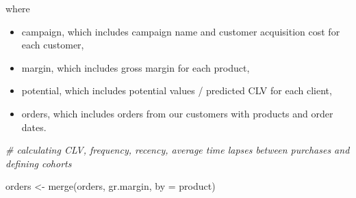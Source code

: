 \documentclass[
]{book}
\newenvironment{Shaded}{\begin{snugshade}}{\end{snugshade}}
\newcommand{\AttributeTok}[1]{\textcolor[rgb]{0.77,0.63,0.00}{#1}}
\newcommand{\CommentTok}[1]{\textcolor[rgb]{0.56,0.35,0.01}{\textit{#1}}}
\newcommand{\FunctionTok}[1]{\textcolor[rgb]{0.00,0.00,0.00}{#1}}
\newcommand{\NormalTok}[1]{#1}
\newcommand{\OtherTok}[1]{\textcolor[rgb]{0.56,0.35,0.01}{#1}}
\newcommand{\StringTok}[1]{\textcolor[rgb]{0.31,0.60,0.02}{#1}}
\providecommand{\tightlist}{%
  \setlength{\itemsep}{0pt}\setlength{\parskip}{0pt}}
\begin{document}
where

\begin{itemize}
\tightlist
\item
  campaign, which includes campaign name and customer acquisition cost for each customer,
\item
  margin, which includes gross margin for each product,
\item
  potential, which includes potential values / predicted CLV for each client,
\item
  orders, which includes orders from our customers with products and order dates.
\end{itemize}

\begin{Shaded}
\begin{Highlighting}[]
\CommentTok{\# calculating CLV, frequency, recency, average time lapses between purchases and defining cohorts}

\NormalTok{orders }\OtherTok{\textless{}{-}} \FunctionTok{merge}\NormalTok{(orders, gr.margin, }\AttributeTok{by =} \StringTok{\textquotesingle{}product\textquotesingle{}}\NormalTok{)}


\end{Highlighting}
\end{Shaded}
\end{document}
